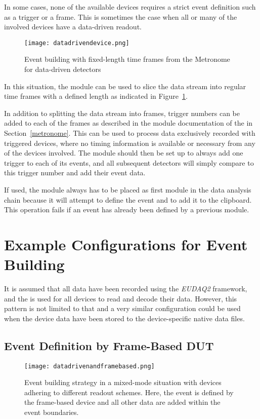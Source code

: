 In some cases, none of the available devices requires a strict event definition such as a trigger or a frame.
This is sometimes the case when all or many of the involved devices have a data-driven readout.

\begin{figure}[tbp]
        \centering
        \texttt{[image: datadrivendevice.png]}
        \caption{Event building with fixed-length time frames from the Metronome for data-driven detectors}
        \label{fig:datadriven}
\end{figure}

In this situation, the  module can be used to slice the data stream into regular time frames with a defined length as indicated in Figure~\ref{fig:datadriven}.

In addition to splitting the data stream into frames, trigger numbers can be added to each of the frames as described in the module documentation of the  in Section~\ref{metronome}.
This can be used to process data exclusively recorded with triggered devices, where no timing information is available or necessary from any of the devices involved.
The module should then be set up to always add one trigger to each of its events, and all subsequent detectors will simply compare to this trigger number and add their event data.

If used, the  module always has to be placed as first module in the data analysis chain because it will attempt to define the event and to add it to the clipboard.
This operation fails if an event has already been defined by a previous module.


\section{Example Configurations for Event Building}

It is assumed that all data have been recorded using the \emph{EUDAQ2} framework, and the  is used for all devices to read and decode their data.
However, this pattern is not limited to that and a very similar configuration could be used when the device data have been stored to the device-specific native data files.

\subsection{Event Definition by Frame-Based DUT}
\label{sec:reco_mixedmode}
\begin{figure}[tbp]
        \centering
        \texttt{[image: datadrivenandframebased.png]}
        \caption{Event building strategy in a mixed-mode situation with devices adhering to different readout schemes. Here, the event is defined by the frame-based device and all other data are added within the event boundaries.}
        \label{fig:datadrivenandframebased}
\end{figure}

